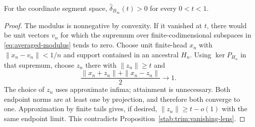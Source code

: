 \begin{corollary}\label{stab:trim:modulus}
For the coordinate segment space, $\widehat\delta_{B_\infty}(t)>0$ for
every $0<t<1$.
\end{corollary}

\begin{proof}
The modulus is nonnegative by convexity. If it vanished at $t$,
there would be unit vectors $v_n$ for which the supremum over
finite-codimensional subspaces in
\eqref{eq:averaged-modulus} tends to zero. Choose unit
finite-head $x_n$ with $\|x_n-v_n\|<1/n$ and support contained
in an ancestral $H_n$. Using $\ker P_{H_n}$ in that supremum,
choose $z_n$ there with $\|z_n\|\ge t$ and
\[
 \frac{\|x_n+z_n\|+\|x_n-z_n\|}{2}\longrightarrow1.
\]
The choice of $z_n$ uses approximate infima; attainment is unnecessary.
Both endpoint norms are at least one by projection, and therefore
both converge to one. Approximation by finite tails gives, if desired,
$\|z_n\|\ge t-o(1)$ with the same endpoint limit. This contradicts
Proposition~\ref{stab:trim:vanishing-lens}.
\end{proof}
